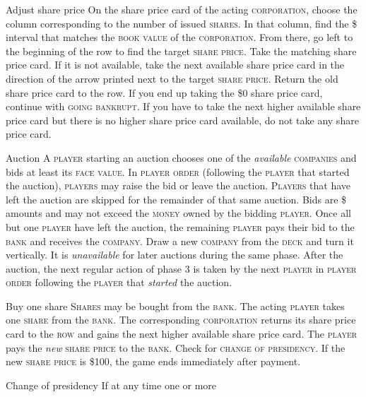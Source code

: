 \documentclass[8pt]{extarticle}
\newenvironment{my_description}
  {\begin{list}{}{\setlength{\labelwidth}{0pt}
   \leftmargin=1.2em
   \setlength{\itemindent}{-\leftmargin}
   \renewcommand{\makelabel}{\descriptionlabel}}
  \setlength{\itemsep}{1pt}
  \setlength{\parskip}{0pt}
  \setlength{\parsep}{0pt}
  }
  {\end{list}}
\begin{document}
\begin{small}
\begin{multicols}{2}
{\begin{my_description}
\item[Adjust share price] On the share price card of the acting
  \textsc{corporation}, choose the column corresponding to the number
  of issued \textsc{shares}. In that column, find the \$ interval that
  matches the \textsc{book value} of the \textsc{corporation}. From
  there, go left to the beginning of the row to find the target
  \textsc{share price}. Take the matching share price card. If it is
  not available, take the next available share price card in the
  direction of the arrow printed next to the target \textsc{share
    price}. Return the old share price card to the row. If you end up
  taking the \$0 share price card, continue with \textsc{going
    bankrupt}. If you have to take the next higher available share
  price card but there is no higher share price card available, do not
  take any share price card.
\item[Auction] A \textsc{player} starting an auction chooses one of
  the \emph{available} \textsc{companies} and bids at least its
  \textsc{face value}. In \textsc{player order} (following the
  \textsc{player} that started the auction), \textsc{players} may
  raise the bid or leave the auction. \textsc{Players} that have left
  the auction are skipped for the remainder of that same auction. Bids
  are \$ amounts and may not exceed the \textsc{money} owned by the
  bidding \textsc{player}. Once all but one \textsc{player} have left
  the auction, the remaining \textsc{player} pays their bid to the
  \textsc{bank} and receives the \textsc{company}. Draw a new
  \textsc{company} from the \textsc{deck} and turn it vertically. It
  is \emph{unavailable} for later auctions during the same
  phase. After the auction, the next regular action of phase 3 is
  taken by the next \textsc{player} in \textsc{player order} following
  the \textsc{player} that \emph{started} the auction.
\item[Buy one share] \textsc{Shares} may be bought from the
  \textsc{bank}. The acting \textsc{player} takes one \textsc{share}
  from the \textsc{bank}. The corresponding \textsc{corporation}
  returns its share price card to the \textsc{row} and gains the next
  higher available share price card. The \textsc{player} pays the
  \emph{new} \textsc{share price} to the \textsc{bank}. Check for
  \textsc{change of presidency}. If the new \textsc{share price} is
  \$100, the game ends immediately after payment.
\item[Change of presidency] If at any time one or more

\end{my_description}}
\end{multicols}
\end{small}
\end{document}
